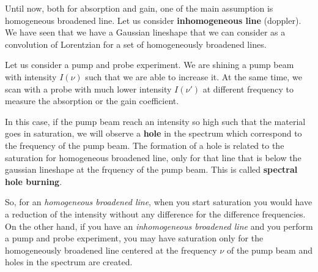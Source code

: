 \documentclass[../main/main.tex]{subfiles}
\begin{document}
\begin{minipage}[c]{0.47\linewidth}

Until now, both for absorption and gain, one of the main assumption is homogeneous broadened line. Let us consider \textbf{inhomogeneous line} (doppler).
We have seen that we have a Gaussian lineshape that we can consider as a convolution of Lorentzian for a set of homogeneously broadened lines.

Let us consider a pump and probe experiment. We are shining a pump beam with intensity \( I(\nu ) \) such that we are able to increase it. At the same time, we scan with a probe with much lower intensity \( I (\nu') \) at different frequency to measure the absorption or the gain coefficient.

\end{minipage}

In this case, if the pump beam reach an intensity so high such that the material goes in saturation, we will observe a \textbf{hole} in the spectrum which correspond to the frequency of the pump beam. The formation of a hole is related to the saturation for homogeneous broadened line, only for that line that is below the gaussian lineshape at the frquency of the pump beam. This is called \textbf{spectral hole burning}.

So, for an \emph{homogeneous broadened line}, when you start saturation you would have a reduction of the intensity without any difference for the difference frequencies.
On the other hand, if you have an \emph{inhomogeneous broadened line} and you perform a pump and probe experiment, you may have saturation only for the homogeneously broadened line centered at the frequency \( \nu  \) of the pump beam and holes in the spectrum are created.
\end{document}
